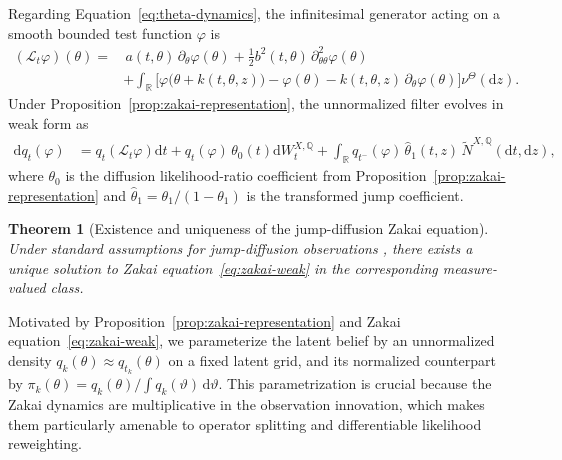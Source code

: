 \documentclass{article}
\newcommand{\R}{\mathbb{R}}
\newcommand{\dd}{\mathrm{d}}
\newtheorem{theorem}{Theorem}
\begin{document}
Regarding Equation~\eqref{eq:theta-dynamics}, the infinitesimal generator acting on a smooth bounded test function $\varphi$ is
\begin{equation*}
\begin{aligned}
(\mathcal L_t\varphi)(\theta)
=
&\,a(t,\theta)\,\partial_\theta\varphi(\theta)
+ \frac12 b^2(t,\theta)\,\partial_{\theta\theta}^2\varphi(\theta) \\
&+\int_{\R}
\Big[
\varphi\!\big(\theta+k(t,\theta,z)\big)
- \varphi(\theta)
- k(t,\theta,z)\,\partial_\theta\varphi(\theta)
\Big]\nu^\Theta(\dd z).
\end{aligned}
\end{equation*}
Under Proposition~\ref{prop:zakai-representation}, the unnormalized filter evolves in weak form as
\begin{equation}
\begin{aligned}
\dd q_t(\varphi)
&=
q_t\!\left(\mathcal L_t\varphi\right)\dd t
+
q_t(\varphi)\,\theta_0(t)\dd W_t^{X,\mathbb Q}
+
\int_{\R}
q_{t^-}(\varphi)\,\hat{\theta}_1(t,z)\,
\widetilde N^{X,\mathbb Q}(\dd t,\dd z),
\end{aligned}
\label{eq:zakai-weak}
\end{equation}
where $\theta_0$ is the diffusion likelihood-ratio coefficient from Proposition~\ref{prop:zakai-representation} and $\hat{\theta}_1 = \theta_1/(1-\theta_1)$ is the transformed jump coefficient.

\begin{theorem}[Existence and uniqueness of the jump-diffusion Zakai equation]
\label{thm:zakai-wellposed}
Under standard assumptions for jump-diffusion observations \citep{CeciColaneri2014ZakaiJumps}, there exists a unique solution to Zakai equation~\eqref{eq:zakai-weak} in the corresponding measure-valued class.
\end{theorem}

Motivated by Proposition~\ref{prop:zakai-representation} and Zakai equation~\eqref{eq:zakai-weak}, we parameterize the latent belief by an unnormalized density $q_k(\theta)\approx q_{t_k}(\theta)$ on a fixed latent grid, and its normalized counterpart by $\pi_k(\theta)=q_k(\theta)/\int q_k(\vartheta)\,\mathrm{d}\vartheta$. This parametrization is crucial because the Zakai dynamics are multiplicative in the observation innovation, which makes them particularly amenable to operator splitting and differentiable likelihood reweighting.
\end{document}
